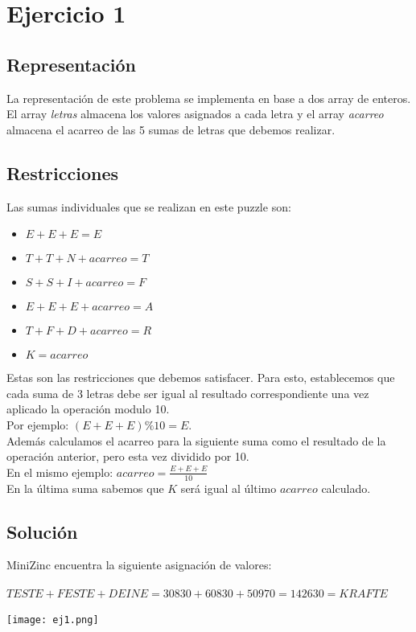 \section{Ejercicio 1}
\subsection{Representación}
La representación de este problema se implementa en base a dos array de enteros. El array \emph{letras} almacena los valores asignados a cada letra y el array \emph{acarreo} almacena el acarreo de las 5 sumas de letras que debemos realizar.

\subsection{Restricciones}
Las sumas individuales que se realizan en este puzzle son:
\begin{itemize}
   \item $ E + E + E = E$
   \item $ T + T + N + acarreo = T$
   \item $ S + S + I + acarreo = F$
   \item $ E + E + E + acarreo = A$
   \item $ T + F + D + acarreo = R$
   \item $ K = acarreo $
\end{itemize}

Estas son las restricciones que debemos satisfacer. Para esto, establecemos que cada suma de 3 letras debe ser igual al resultado correspondiente una vez aplicado la operación modulo 10.
\\
Por ejemplo: $ (E + E + E)\% 10 = E $.
\\
Además calculamos el acarreo para la siguiente suma como el resultado de la operación anterior, pero esta vez dividido por 10.
\\
En el mismo ejemplo: $acarreo = \frac{E+E+E}{10}$
\\
En la última suma sabemos que $K$ será igual al último $acarreo$ calculado.

\subsection{Solución}
MiniZinc encuentra la siguiente asignación de valores:\\
\\
$TESTE + FESTE + DEINE = 30830 + 60830 + 50970 = 142630 = KRAFTE $\\
\\
\texttt{[image: ej1.png]}
